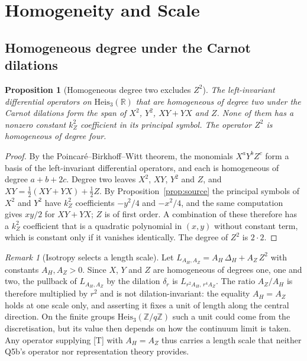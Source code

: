 \documentclass[11pt,a4paper]{article}
\newtheorem{proposition}[theorem]{Proposition}
\theoremstyle{definition}
\theoremstyle{remark}
\newtheorem{remark}[theorem]{Remark}
\newcommand{\heisR}{\mathrm{Heis}_{3}(\mathbb{R})}
\newcommand{\Az}{A_{Z}}
\newcommand{\AH}{A_{H}}
\begin{document}
  \section{Homogeneity and Scale}\label{sec:beals}

    \subsection{Homogeneous degree under the Carnot dilations}

      \begin{proposition}[Homogeneous degree two excludes $Z^2$]\label{prop:bg}
        The left-invariant differential operators on $\heisR$ that are homogeneous of degree two under the Carnot
        dilations form the span of $X^2$, $Y^2$, $XY + YX$ and $Z$.
        None of them has a nonzero constant $k_Z^2$ coefficient in its principal symbol.
        The operator $Z^2$ is homogeneous of degree four.
      \end{proposition}

      \begin{proof}
        By the Poincar\'e--Birkhoff--Witt theorem, the monomials $X^a Y^b Z^c$ form a basis of the left-invariant
        differential operators, and each is homogeneous of degree $a + b + 2c$.
        Degree two leaves $X^2$, $XY$, $Y^2$ and $Z$, and $XY = \frac12(XY + YX) + \frac12 Z$.
        By Proposition~\ref{prop:source} the principal symbols of $X^2$ and $Y^2$ have $k_Z^2$ coefficients $-y^2/4$
        and $-x^2/4$, and the same computation gives $xy/2$ for $XY + YX$; $Z$ is of first order.
        A combination of these therefore has a $k_Z^2$ coefficient that is a quadratic polynomial in $(x, y)$ without
        constant term, which is constant only if it vanishes identically.
        The degree of $Z^2$ is $2 \cdot 2$.
      \end{proof}

      \begin{remark}[Isotropy selects a length scale]\label{rem:scale}
        Let $L_{A_H, A_Z} = A_H\,\Delta_H + A_Z\,Z^2$ with constants $A_H, A_Z > 0$.
        Since $X$, $Y$ and $Z$ are homogeneous of degrees one, one and two, the pullback of $L_{A_H, A_Z}$ by the
        dilation $\delta_r$ is $L_{r^2 A_H,\, r^4 A_Z}$.
        The ratio $A_Z/A_H$ is therefore multiplied by $r^2$ and is not dilation-invariant: the equality
        $A_H = A_Z$ holds at one scale only, and asserting it fixes a unit of length along the central direction.
        On the finite groups $\mathrm{Heis}_3(\mathbb{Z}/q\mathbb{Z})$ such a unit could come from the discretisation,
        but its value then depends on how the continuum limit is taken.
        Any operator supplying [T] with $\AH = \Az$ thus carries a length scale that neither Q5b's operator nor
        representation theory provides.
      \end{remark}
\end{document}
